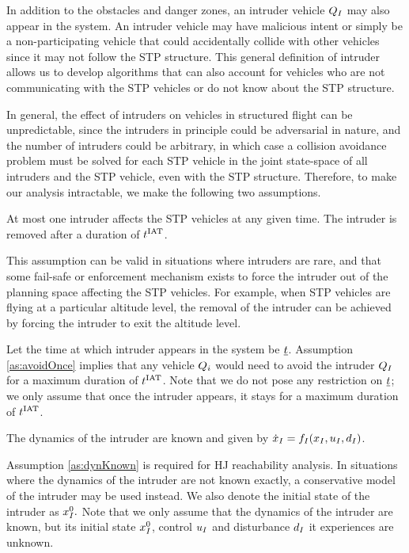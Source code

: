 In addition to the obstacles and danger zones, an intruder vehicle $Q_{I}$ may also appear in the system. An intruder vehicle may have malicious intent or simply be a non-participating vehicle that could accidentally collide with other vehicles since it may not follow the STP structure. This general definition of intruder allows us to develop algorithms that can also account for vehicles who are not communicating with the STP vehicles or do not know about the STP structure.

In general, the effect of intruders on vehicles in structured flight can be unpredictable, since the intruders in principle could be adversarial in nature, and the number of intruders could be arbitrary, in which case a collision avoidance problem must be solved for each STP vehicle in the joint state-space of all intruders and the STP vehicle, even with the STP structure. Therefore, to make our analysis intractable, we make the following two assumptions.
\begin{assumption}
\label{as:avoidOnce}
At most one intruder affects the STP vehicles at any given time. The intruder is removed after a duration of $t^\text{IAT}$. 
\end{assumption}    
This assumption can be valid in situations where intruders are rare, and that some fail-safe or enforcement mechanism exists to force the intruder out of the planning space affecting the STP vehicles. For example, when STP vehicles are flying at a particular altitude level, the removal of the intruder can be achieved by forcing the intruder to exit the altitude level. 
 
Let the time at which intruder appears in the system be $\underline{t}$. Assumption \ref{as:avoidOnce} implies that any vehicle $Q_i$ would need to avoid the intruder $Q_{I}$ for a maximum duration of $t^\text{IAT}$. 
Note that we do not pose any restriction on $\underline{t}$; we only assume that once the intruder appears, it stays for a maximum duration of $t^\text{IAT}$.
\begin{assumption}
\label{as:dynKnown}
The dynamics of the intruder are known and given by $\dot{x}_I = f_I(x_I, u_I, d_I)$.
\end{assumption}
Assumption \ref{as:dynKnown} is required for HJ reachability analysis. In situations where the dynamics of the intruder are not known exactly, a conservative model of the intruder may be used instead. We also denote the initial state of the intruder as $x_{I}^0.$ Note that we only assume that the dynamics of the intruder are known, but its initial state $x_{I}^0$, control $u_I$ and disturbance $d_I$ it experiences are unknown.

